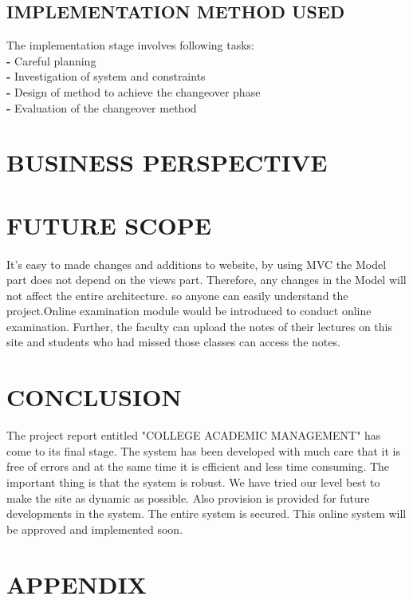 \documentclass[a4paper, 12pt]{report}
\begin{document}
{{{{\subsection{IMPLEMENTATION METHOD USED}
The implementation stage involves following tasks: \\
\linebreak
\textbf{- }Careful planning \\
\textbf{- }Investigation of system and constraints \\
\textbf{- }Design of method to achieve the changeover phase \\
\textbf{- }Evaluation of the changeover method \\

\section{BUSINESS PERSPECTIVE}


\section{FUTURE SCOPE}
\paragraph{}It's easy to made changes and additions to website, by using MVC the Model part does not depend on the views part. Therefore, any changes in the Model will not affect the entire architecture. so anyone can easily understand the project.Online examination module would be introduced to conduct online examination.
Further, the faculty can upload the notes of their lectures on this site and students who had missed those classes can access the notes.   
\section{CONCLUSION}
The project report entitled "COLLEGE ACADEMIC MANAGEMENT" has come to its final stage. The system has been developed with much care that it is free of errors and at the same time it is efficient and less time consuming. The important thing is that the system is robust. We have tried our level best to make the site as dynamic as possible. Also provision is provided for future developments in the system. The entire system is secured. This online system will be approved and implemented soon. 

\newpage
\section{APPENDIX}
}}}}
\end{document}
